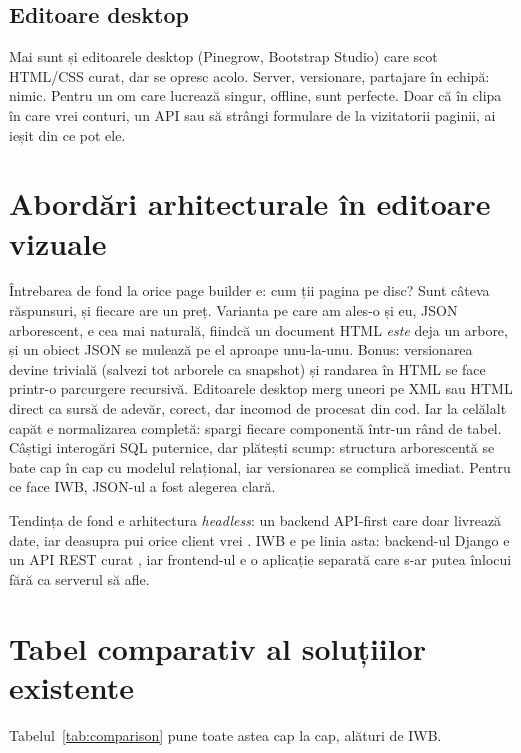 \documentclass[12pt,a4paper]{report}
\begin{document}
\subsection{Editoare desktop}

Mai sunt și editoarele desktop (Pinegrow, Bootstrap Studio) care scot HTML/CSS
curat, dar se opresc acolo. Server, versionare, partajare în echipă: nimic. Pentru un
om care lucrează singur, offline, sunt perfecte. Doar că în clipa în care vrei conturi,
un API sau să strângi formulare de la vizitatorii paginii, ai ieșit din ce pot ele.

\section{Abordări arhitecturale în editoare vizuale}

Întrebarea de fond la orice page builder e: cum ții pagina pe disc? Sunt câteva
răspunsuri, și fiecare are un preț. Varianta pe care am ales-o și eu, JSON
arborescent, e cea mai naturală, fiindcă un document HTML \emph{este} deja un
arbore, și un obiect JSON se mulează pe el aproape unu-la-unu. Bonus: versionarea
devine trivială (salvezi tot arborele ca snapshot) și randarea în HTML se face printr-o
parcurgere recursivă. Editoarele desktop merg uneori pe XML sau HTML direct ca sursă
de adevăr, corect, dar incomod de procesat din cod. Iar la celălalt capăt e
normalizarea completă: spargi fiecare componentă într-un rând de tabel. Câștigi
interogări SQL puternice, dar plătești scump: structura arborescentă se bate cap în
cap cu modelul relațional, iar versionarea se complică imediat. Pentru ce face IWB,
JSON-ul a fost alegerea clară.

Tendința de fond e arhitectura \textit{headless}: un backend API-first care doar
livrează date, iar deasupra pui orice client vrei \cite{mdnFetch}. IWB e pe
linia asta: backend-ul Django e un API REST curat \cite{fielding2000}, iar
frontend-ul e o aplicație separată care s-ar putea înlocui fără ca serverul să afle.

\section{Tabel comparativ al soluțiilor existente}

Tabelul~\ref{tab:comparison} pune toate astea cap la cap, alături de IWB.
\end{document}
